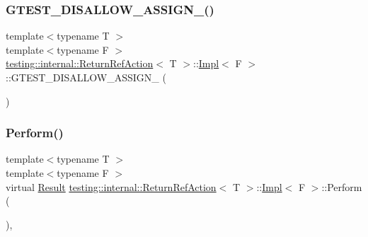 \subsubsection{\texorpdfstring{G\+T\+E\+S\+T\+\_\+\+D\+I\+S\+A\+L\+L\+O\+W\+\_\+\+A\+S\+S\+I\+G\+N\+\_\+()}{GTEST\_DISALLOW\_ASSIGN\_()}}
{\footnotesize\ttfamily template$<$typename T $>$ \\
template$<$typename F $>$ \\
\hyperlink{classtesting_1_1internal_1_1ReturnRefAction}{testing\+::internal\+::\+Return\+Ref\+Action}$<$ T $>$\+::\hyperlink{classtesting_1_1internal_1_1ReturnRefAction_1_1Impl}{Impl}$<$ F $>$\+::G\+T\+E\+S\+T\+\_\+\+D\+I\+S\+A\+L\+L\+O\+W\+\_\+\+A\+S\+S\+I\+G\+N\+\_\+ (\begin{DoxyParamCaption}\item[{\hyperlink{classtesting_1_1internal_1_1ReturnRefAction_1_1Impl}{Impl}$<$ F $>$}]{ }\end{DoxyParamCaption})\hspace{0.3cm}{\ttfamily [private]}}

\mbox{\label{classtesting_1_1internal_1_1ReturnRefAction_1_1Impl_ae65024d38782cd53a194346ace6ed9af}} 
\subsubsection{\texorpdfstring{Perform()}{Perform()}}
{\footnotesize\ttfamily template$<$typename T $>$ \\
template$<$typename F $>$ \\
virtual \hyperlink{classtesting_1_1ActionInterface_a7477de2fe3e4e01c59db698203acaee7}{Result} \hyperlink{classtesting_1_1internal_1_1ReturnRefAction}{testing\+::internal\+::\+Return\+Ref\+Action}$<$ T $>$\+::\hyperlink{classtesting_1_1internal_1_1ReturnRefAction_1_1Impl}{Impl}$<$ F $>$\+::Perform (\begin{DoxyParamCaption}\item[{const \hyperlink{classtesting_1_1ActionInterface_af72720d864da4d606629e83edc003511}{Argument\+Tuple} \&}]{ }\end{DoxyParamCaption})\hspace{0.3cm}{\ttfamily [inline]}, {\ttfamily [virtual]}}



